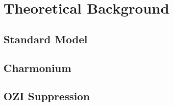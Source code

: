 \chapter{Theoretical Background}
\label{ch_theory}

\section{Standard Model}

\section{Charmonium}

\section{OZI Suppression}